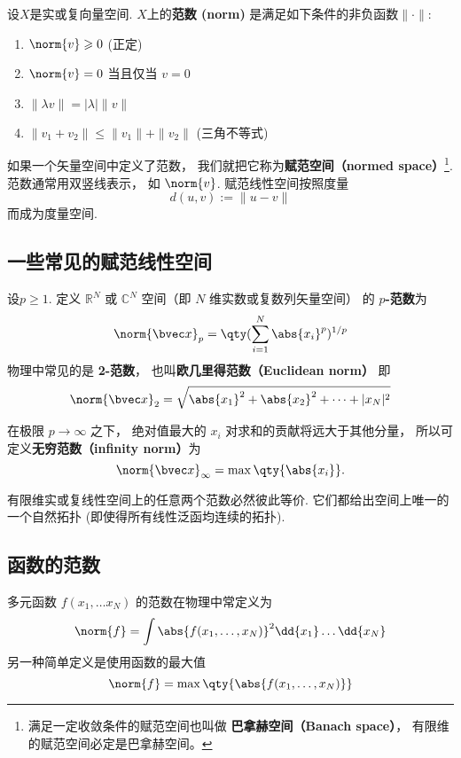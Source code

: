 

设$X$是实或复向量空间. $X$上的\textbf{范数 (norm)} 是满足如下条件的非负函数$\|\cdot\|$:
\begin{enumerate}
\item $\norm{v} \geqslant 0$ (正定)
\item $\norm{v} = 0$ 当且仅当 $v = 0$
\item $\|\lambda v\| = |\lambda|\| v\|$
\item $\|v_1+v_2\| \leqslant \|v_1\|+ \|v_2\|$ (三角不等式)
\end{enumerate}

如果一个矢量空间中定义了范数， 我们就把它称为\textbf{赋范空间（normed space）}\footnote{满足一定收敛条件的赋范空间也叫做 \textbf{巴拿赫空间（Banach space）}， 有限维的赋范空间必定是巴拿赫空间。%
}. 范数通常用双竖线表示， 如 $\norm{v}$. 赋范线性空间按照度量
$$
d(u,v):=\|u-v\|
$$
而成为度量空间. 

\subsection{一些常见的赋范线性空间}
设$p\geq1$. 定义 $\mathbb R^N$ 或 $\mathbb C^N$ 空间（即 $N$ 维实数或复数列矢量空间） 的 \textbf{$p$-范数}为
\begin{equation}
\norm{\bvec x}_p = \qty(\sum_{i=1}^N \abs{x_i}^p)^{1/p}
\end{equation}
物理中常见的是 \textbf{2-范数}， 也叫\textbf{欧几里得范数（Euclidean norm）} 即
\begin{equation}
\norm{\bvec x}_2 = \sqrt{\abs{x_1}^2 + \abs{x_2}^2 + \dots+|x_N|^2}
\end{equation}

在极限 $p \to \infty$ 之下， 绝对值最大的 $x_i$ 对求和的贡献将远大于其他分量， 所以可定义\textbf{无穷范数（infinity norm）}为
\begin{equation}
\norm{\bvec x}_\infty = \max \qty{\abs{x_i}}.
\end{equation}

有限维实或复线性空间上的任意两个范数必然彼此等价. 它们都给出空间上唯一的一个自然拓扑 (即使得所有线性泛函均连续的拓扑).

\subsection{函数的范数}
多元函数 $f(x_1, \dots x_N)$ 的范数在物理中常定义为
\begin{equation}
\norm{f} = \int \abs{f(x_1, \dots, x_N)}^2 \dd{x_1}\dots \dd{x_N}
\end{equation}
另一种简单定义是使用函数的最大值
\begin{equation}
\norm{f} = \max\qty{\abs{f(x_1, \dots, x_N)}}
\end{equation}
